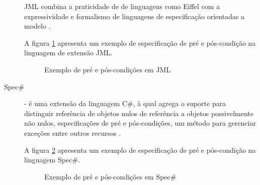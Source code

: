 \begin{description}
JML combina a praticidade de \designbycontract{} de linguagens como Eiffel com a
expressividade e formalismo de linguagens de especificação orientadas a modelo
\cite{leavens2006design}. 

A figura \ref{lst:exemploJML} apresenta um exemplo de especificação de pré e
pós-condição na linguagem de extensão JML.

\begin{figure}[h]
\begin{small}

\vspace{-.5cm}
\end{small}
\caption{Exemplo de pré e pós-condições em JML}
\label{lst:exemploJML}
\end{figure}
 
\vspace{8mm}

\item[Spec\#] - é uma extensão da linguagem C\#, à qual agrega o suporte para
distinguir referência de objetos nulos de referência a objetos possivelmente não
nulos, especificações de pré e pós-condições, um método para gerenciar exceções
entre outros recursos \cite{barnett2004spec}.

A figura \ref{lst:exemploSpec} apresenta um exemplo de especificação de pré e
pós-condição na linguagem Spec\#.

\vspace{6mm}

\begin{figure}[h]
\begin{small}

\vspace{-.5cm}
\end{small}
\caption{Exemplo de pré e pós-condições em Spec\#}
\label{lst:exemploSpec}
\end{figure}


\end{description}





 

